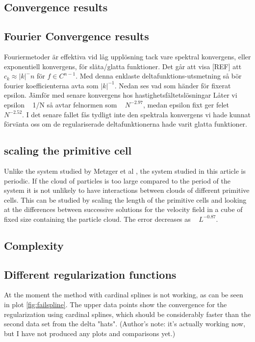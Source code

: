 \documentclass[a4paper,twoside=false,abstract=false,numbers=noenddot,
titlepage=false,headings=small,parskip=half,version=last]{scrartcl}
\begin{document}
\subsection{Convergence results}
\subsection{Fourier Convergence results}
Fouriermetoder är effektiva vid låg upplösning tack vare spektral konvergens, eller exponentiell konvergens, för släta/glatta funktioner. Det går att visa [REF] att $c_k \approx |k|^-n$ för $f \in C^{n-1}$.
Med denna enklaste deltafunktions-utsmetning så bör fourier koefficienterna avta som $|k|^{-1}$.
Nedan ses vad som händer för fixerat epsilon. Jämför med senare 
konvergens hos hastighetsfältetslösningar
Låter vi epsilon ~ 1/N så avtar felnormen som ~ $N^{-2.97}$, medan epsilon fixt ger felet ~ $N^{-2.52}$. I det senare fallet fås tydligt inte den spektrala konvergens vi hade kunnat förvänta oss om de regulariserade deltafunktionerna hade varit glatta funktioner.

\subsection{scaling the primitive cell}\label{cellscale}
Unlike the system studied by Metzger et al \cite{fallingclouds}, the system studied in this article is periodic. If the cloud of particles is too large compared to the period of the system it is not unlikely to have interactions between clouds of different primitive cells. This can be studied by scaling the length of the primitive cells and looking at the differences between successive solutions for the velocity field in a cube of fixed size containing the particle cloud. The error decreases as ~ $L^{-0.87}$.

\subsection{Complexity}
\subsection{Different regularization functions}
At the moment the method with cardinal splines is not working, as can be seen in plot \ref{fig:failspline}. The upper data points show the convergence for the regularization using cardinal splines, which should be considerably faster than the second data set from the delta "hats". (Author's note: it's actually working now, but I have not produced any plots and comparisons yet.)
\end{document}
